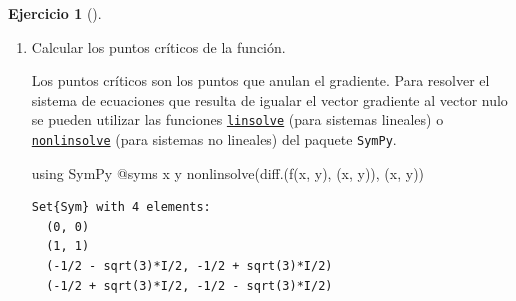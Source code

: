 \documentclass[
  a4paper,
]{scrreport}
\newenvironment{Shaded}{\begin{snugshade}}{\end{snugshade}}
\newcommand{\BuiltInTok}[1]{\textcolor[rgb]{0.00,0.23,0.31}{#1}}
\newcommand{\FunctionTok}[1]{\textcolor[rgb]{0.28,0.35,0.67}{#1}}
\newcommand{\ImportTok}[1]{\textcolor[rgb]{0.00,0.46,0.62}{#1}}
\newcommand{\NormalTok}[1]{\textcolor[rgb]{0.00,0.23,0.31}{#1}}
\newcommand{\PreprocessorTok}[1]{\textcolor[rgb]{0.68,0.00,0.00}{#1}}
\theoremstyle{definition}
\newtheorem{exercise}{Ejercicio}[chapter]
\theoremstyle{remark}
\begin{document}
\begin{exercise}[]
\begin{enumerate}
\begin{tcolorbox}
  \end{tcolorbox}
\item
  Calcular los puntos críticos de la función.

  \begin{tcolorbox}[enhanced jigsaw, bottomtitle=1mm, rightrule=.15mm, left=2mm, colback=white, title=\textcolor{quarto-callout-note-color}{\faInfo}\hspace{0.5em}{Ayuda}, bottomrule=.15mm, colframe=quarto-callout-note-color-frame, toprule=.15mm, leftrule=.75mm, opacityback=0, coltitle=black, breakable, colbacktitle=quarto-callout-note-color!10!white, arc=.35mm, toptitle=1mm, titlerule=0mm, opacitybacktitle=0.6]

  Los puntos críticos son los puntos que anulan el gradiente. Para
  resolver el sistema de ecuaciones que resulta de igualar el vector
  gradiente al vector nulo se pueden utilizar las funciones
  \href{https://docs.juliahub.com/SymPy/KzewI/1.2.1/Tutorial/solvers/\#Solving-Equations-Algebraically}{\texttt{linsolve}}
  (para sistemas lineales) o
  \href{https://docs.juliahub.com/SymPy/KzewI/1.2.1/Tutorial/solvers/\#Solving-Equations-Algebraically}{\texttt{nonlinsolve}}
  (para sistemas no lineales) del paquete \texttt{SymPy}.

  \end{tcolorbox}

  \begin{tcolorbox}[enhanced jigsaw, bottomtitle=1mm, rightrule=.15mm, left=2mm, colback=white, title=\textcolor{quarto-callout-tip-color}{\faLightbulb}\hspace{0.5em}{Solución}, bottomrule=.15mm, colframe=quarto-callout-tip-color-frame, toprule=.15mm, leftrule=.75mm, opacityback=0, coltitle=black, breakable, colbacktitle=quarto-callout-tip-color!10!white, arc=.35mm, toptitle=1mm, titlerule=0mm, opacitybacktitle=0.6]

\begin{Shaded}
\begin{Highlighting}[]
\ImportTok{using} \BuiltInTok{SymPy}
\PreprocessorTok{@syms}\NormalTok{ x y}
\FunctionTok{nonlinsolve}\NormalTok{(}\FunctionTok{diff}\NormalTok{.(}\FunctionTok{f}\NormalTok{(x, y), (x, y)), (x, y))}
\end{Highlighting}
\end{Shaded}

\begin{verbatim}
Set{Sym} with 4 elements:
  (0, 0)
  (1, 1)
  (-1/2 - sqrt(3)*I/2, -1/2 + sqrt(3)*I/2)
  (-1/2 + sqrt(3)*I/2, -1/2 - sqrt(3)*I/2)
\end{verbatim}


\end{tcolorbox}
\end{enumerate}
\end{exercise}
\end{document}
